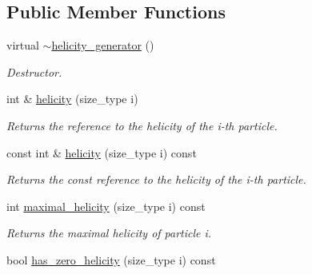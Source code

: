 \subsection*{Public Member Functions}
\begin{DoxyCompactItemize}
\item 
\hypertarget{a00271_a225344dbb12c3e0ab9d20d94a7890809}{}virtual \hyperlink{a00271_a225344dbb12c3e0ab9d20d94a7890809}{$\sim$helicity\+\_\+generator} ()\label{a00271_a225344dbb12c3e0ab9d20d94a7890809}

\begin{DoxyCompactList}\small\item\em Destructor. \end{DoxyCompactList}\item 
\hypertarget{a00271_af547f9bf6b087eb596ee75c730fc84d2}{}int \& \hyperlink{a00271_af547f9bf6b087eb596ee75c730fc84d2}{helicity} (size\+\_\+type i)\label{a00271_af547f9bf6b087eb596ee75c730fc84d2}

\begin{DoxyCompactList}\small\item\em Returns the reference to the helicity of the i-\/th particle. \end{DoxyCompactList}\item 
\hypertarget{a00271_a9bbbbc353160c3c324dad288dc92ad67}{}const int \& \hyperlink{a00271_a9bbbbc353160c3c324dad288dc92ad67}{helicity} (size\+\_\+type i) const \label{a00271_a9bbbbc353160c3c324dad288dc92ad67}

\begin{DoxyCompactList}\small\item\em Returns the const reference to the helicity of the i-\/th particle. \end{DoxyCompactList}\item 
\hypertarget{a00271_a4d9caa3945423bff1cedb9e3f120ae0f}{}int \hyperlink{a00271_a4d9caa3945423bff1cedb9e3f120ae0f}{maximal\+\_\+helicity} (size\+\_\+type i) const \label{a00271_a4d9caa3945423bff1cedb9e3f120ae0f}

\begin{DoxyCompactList}\small\item\em Returns the maximal helicity of particle i. \end{DoxyCompactList}\item 
\hypertarget{a00271_a553cc4fe3cdd3161718190684845edc7}{}bool \hyperlink{a00271_a553cc4fe3cdd3161718190684845edc7}{has\+\_\+zero\+\_\+helicity} (size\+\_\+type i) const \label{a00271_a553cc4fe3cdd3161718190684845edc7}


\end{DoxyCompactItemize}
